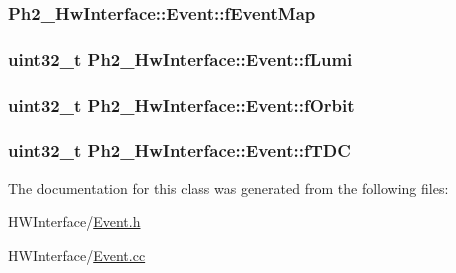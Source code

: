 \hypertarget{class_ph2___hw_interface_1_1_event_ace9844f1fc14895f880ed111c705d392}{
\subsubsection[{f\-Event\-Map}]{ Ph2\-\_\-\-Hw\-Interface\-::\-Event\-::f\-Event\-Map\hspace{0.3cm}{\ttfamily [private]}}}\label{class_ph2___hw_interface_1_1_event_ace9844f1fc14895f880ed111c705d392}
\hypertarget{class_ph2___hw_interface_1_1_event_a78afd0886560acf70ee6b982c5690e0a}{
\subsubsection[{f\-Lumi}]{\setlength{\rightskip}{0pt plus 5cm}uint32\-\_\-t Ph2\-\_\-\-Hw\-Interface\-::\-Event\-::f\-Lumi\hspace{0.3cm}{\ttfamily [private]}}}\label{class_ph2___hw_interface_1_1_event_a78afd0886560acf70ee6b982c5690e0a}
\hypertarget{class_ph2___hw_interface_1_1_event_a6aa6c402d2b16e735fbb4b7518c2666e}{
\subsubsection[{f\-Orbit}]{\setlength{\rightskip}{0pt plus 5cm}uint32\-\_\-t Ph2\-\_\-\-Hw\-Interface\-::\-Event\-::f\-Orbit\hspace{0.3cm}{\ttfamily [private]}}}\label{class_ph2___hw_interface_1_1_event_a6aa6c402d2b16e735fbb4b7518c2666e}
\hypertarget{class_ph2___hw_interface_1_1_event_ab91638311238d12f1cd258556c8d1d80}{
\subsubsection[{f\-T\-D\-C}]{\setlength{\rightskip}{0pt plus 5cm}uint32\-\_\-t Ph2\-\_\-\-Hw\-Interface\-::\-Event\-::f\-T\-D\-C\hspace{0.3cm}{\ttfamily [private]}}}\label{class_ph2___hw_interface_1_1_event_ab91638311238d12f1cd258556c8d1d80}


The documentation for this class was generated from the following files\-:\begin{DoxyCompactItemize}
\item 
H\-W\-Interface/\hyperlink{_event_8h}{Event.\-h}\item 
H\-W\-Interface/\hyperlink{_event_8cc}{Event.\-cc}\end{DoxyCompactItemize}
